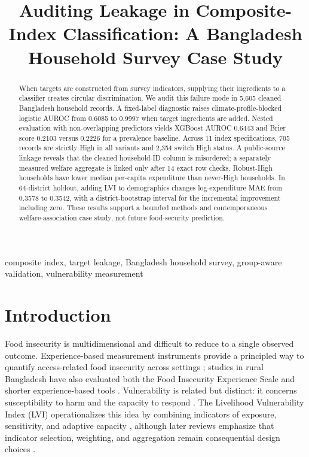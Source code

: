 \documentclass[conference,a4paper]{IEEEtran}
\title{Auditing Leakage in Composite-Index Classification: A Bangladesh Household Survey Case Study}
\author{}
\begin{document}
\maketitle

\begin{abstract}
When targets are constructed from survey indicators, supplying their ingredients to a classifier creates circular discrimination. We audit this failure mode in 5,605 cleaned Bangladesh household records. A fixed-label diagnostic raises climate-profile-blocked logistic AUROC from 0.6085 to 0.9997 when target ingredients are added. Nested evaluation with non-overlapping predictors yields XGBoost AUROC 0.6443 and Brier score 0.2103 versus 0.2226 for a prevalence baseline. Across 11 index specifications, 705 records are strictly High in all variants and 2,354 switch High status. A public-source linkage reveals that the cleaned household-ID column is misordered; a separately measured welfare aggregate is linked only after 14 exact row checks. Robust-High households have lower median per-capita expenditure than never-High households. In 64-district holdout, adding LVI to demographics changes log-expenditure MAE from 0.3578 to 0.3542, with a district-bootstrap interval for the incremental improvement including zero. These results support a bounded methods and contemporaneous welfare-association case study, not future food-security prediction.
\end{abstract}

\begin{IEEEkeywords}
composite index, target leakage, Bangladesh household survey, group-aware validation, vulnerability measurement
\end{IEEEkeywords}

\section{Introduction}
Food insecurity is multidimensional and difficult to reduce to a single observed outcome. Experience-based measurement instruments provide a principled way to quantify access-related food insecurity across settings \cite{cafiero2018fies}; studies in rural Bangladesh have also evaluated both the Food Insecurity Experience Scale and shorter experience-based tools \cite{jubayer2023fies,na2015fast}. Vulnerability is related but distinct: it concerns susceptibility to harm and the capacity to respond \cite{adger2006vulnerability}. The Livelihood Vulnerability Index (LVI) operationalizes this idea by combining indicators of exposure, sensitivity, and adaptive capacity \cite{hahn2009lvi}, although later reviews emphasize that indicator selection, weighting, and aggregation remain consequential design choices \cite{zainab2024taking}.
\end{document}
